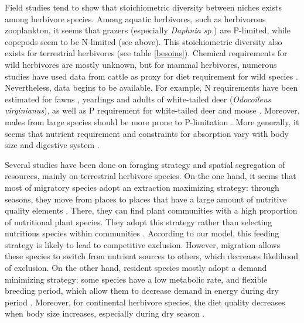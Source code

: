 \documentclass[12pt]{article}
\begin{document}
Field studies tend to show that stoichiometric diversity between niches exists among herbivore species. Among aquatic herbivores, such as herbivorous zooplankton, it seems that grazers (especially \textit{Daphnia sp.}) are P-limited, while copepods seem to be N-limited (see above). This stoichiometric diversity also exists for terrestrial herbivores (see table \ref{besoins}). Chemical requirements %
for wild herbivores are mostly unknown, but for mammal herbivores, numerous studies have used data from cattle as proxy for diet requirement for wild species \citep{Voeten1999}. Nevertheless, data begins to be available. For example,  N requirements have been estimated for fawns \citep{Smith1975}, yearlings \citep{Holter1979} and adults \citep{Asleson1996} of white-tailed deer (\textit{Odocoileus virginianus}), as well as P requirement for white-tailed deer \citep{Grasman1993} and moose \citep{Schwartz1987}. Moreover, males from large species should be more prone to P-limitation \citep{Grasman1993}. More generally, it seems that nutrient requirement and constraints for absorption vary with body size and digestive system \citep{Janis1976}. 
\par 
Several studies have been done on foraging strategy and spatial segregation of resources, mainly on terrestrial herbivore species. On the one hand, it seems that most of  migratory species adopt an extraction maximizing strategy: through seasons, they move from places to places that have a large amount of nutritive quality elements \citep{Albon1992}. There, they can find plant communities with a high proportion of nutritional plant species. They adopt this strategy rather than selecting nutritious species within communities \citep{Ben-Shahar1992}. According to our model, this feeding strategy is likely to lead to competitive exclusion. However, migration allows these species to switch from nutrient sources to others, which decreases likelihood of exclusion. On the other hand, resident species mostly adopt a demand minimizing strategy: some species have a low metabolic rate, and flexible breeding period, which allow them to decrease demand in energy during dry period \citep{Murray1991}. Moreover, for continental herbivore species, the diet quality decreases when body size increases, especially during dry season \citep{Codron2007}. 
\par
\end{document}
